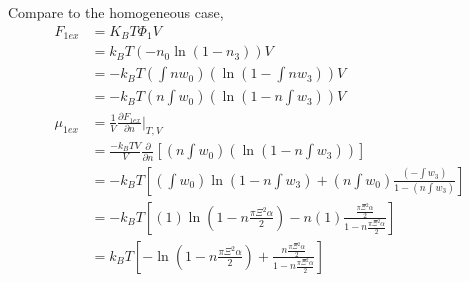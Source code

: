 \documentclass[double,12pt]{revtex4-2}
\begin{document}
Compare to the homogeneous case,
\begin{align}
    F_{1ex} &= K_BT\Phi_1 V\\
           &= k_BT\left(-n_0\ln\left(1-n_3\right)\right)V  \\
           &= -k_BT\left(\int nw_0 \right)\left(\ln\left(1-\int nw_3\right)\right)V  \\
           &= -k_BT\left(n\int w_0 \right)\left(\ln\left(1-n\int w_3\right)\right)V  \\
 \mu_{1ex} &= \frac{1}{V}\frac{\partial F_{1ex}}{\partial n} \bigg|_{T,V}\\
           &= \frac{-k_BTV}{V} \frac{\partial}{\partial n}\left[ \left(n\int w_0 \right)\left(\ln\left(1-n\int w_3\right)\right)\right]\\
           &= - k_BT\left[\left(\int w_0\right)\ln\left(1-n\int w_3\right) +\left(n\int w_0 \right)\frac{\left(-\int w_3\right)}{1-\left(n\int w_3\right)}\right]\\
           &= - k_BT\left[(1)\ln\left(1-n\frac{\pi\Xi^2\alpha}{2}\right) -n\left(1\right)\frac{\frac{\pi\Xi^2\alpha}{2}}{1-n\frac{\pi\Xi^2\alpha}{2}}\right]\\
           &= k_BT\left[-\ln\left(1-n\frac{\pi\Xi^2\alpha}{2}\right) +\frac{n\frac{\pi\Xi^2\alpha}{2}}{1-n\frac{\pi\Xi^2\alpha}{2}}\right]
\end{align}
\end{document}
